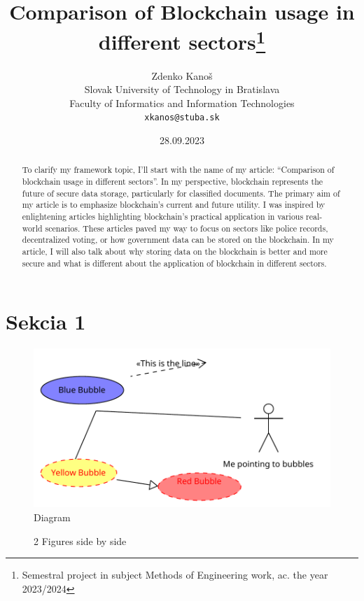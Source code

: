 \documentclass[10pt,english,a4paper]{article}
\title{Comparison of Blockchain usage in different sectors\thanks{Semestral project in subject Methods of Engineering work, ac. the year 2023/2024}}
\author{Zdenko Kanoš\\[2pt]
	{\small Slovak University of Technology in Bratislava}\\
	{\small Faculty of Informatics and Information Technologies}\\
	{\small \texttt{xkanos@stuba.sk}}
	}
\date{\small 28.09.2023}
\begin{document}
\maketitle

\begin{abstract}
To clarify my framework topic, I'll start with the name of my article: “Comparison of
blockchain usage in different sectors”. In my perspective, blockchain represents the future
of secure data storage, particularly for classified documents. The primary aim of my article is
to emphasize blockchain’s current and future utility. I was inspired by enlightening articles
highlighting blockchain's practical application in various real-world scenarios. These articles
paved my way to focus on sectors like police records, decentralized voting, or how
government data can be stored on the blockchain. In my article, I will also talk about why
storing data on the blockchain is better and more secure and what is different about the
application of blockchain in different sectors.
\end{abstract}

\section{Sekcia 1}
 \lipsum[1-3]
  \begin{figure}
  \centering
   \includegraphics[scale=0.8]{Diagram_1.pdf}
  \centering
  \caption{Diagram}
 \end{figure}
 \lipsum[1-2]
 
 \begin{figure}%
    \centering
    \qquad
    \caption{2 Figures side by side}%
    \label{fig:example}%
\end{figure}
 
\end{document}
